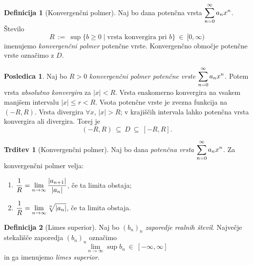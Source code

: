 \documentclass[11pt]{article}
\theoremstyle{definition}
\newtheorem{definicija}{Definicija}[section]
\theoremstyle{definition}
\newtheorem{trditev}{Trditev}[section]
\theoremstyle{definition}
\theoremstyle{theorem}
\newtheorem*{posledica}{Posledica}
\begin{document}
\begin{definicija}[Konvergenčni polmer]

Naj bo dana potenčna vrsta $\mathlarger{\sum_{n=0}^{\infty} a_n x^n}$. Število
$$R ~:=~ \sup \{b \geq 0 \mid \text{vrsta konvergira pri } b \} ~\in~ [0, \infty)$$
imenujemo \textit{konvergenčni polmer} potenčne vrste. Konvergenčno območje potenčne vrste označimo z $D$.

\end{definicija}
\vspace{0.5cm}

\begin{posledica}

Naj bo $R > 0$ \textit{konvergenčni polmer potenčne vrste} $\mathlarger{\sum_{n=0}^{\infty} a_n x^n}$. Potem vrsta \textit{absolutno konvergira} za $|x| < R$. Vrsta enakomerno konvergira na vsakem manjšem intervalu $|x| \leq r < R$. Vsota potenčne vrste je zvezna funkcija na $(-R, R)$. Vrsta divergira $\forall x$, $|x| > R$; v krajiščih intervala lahko potenčna vrsta konvergira ali divergira. Torej je
$$(-R, R) ~\subseteq~ D ~\subseteq~ [-R, R].$$

\end{posledica}
\vspace{0.5cm}

\begin{trditev}[Konvergenčni polmer]

Naj bo dana \textit{potenčna vrsta} $\mathlarger{\sum_{n=0}^\infty a_n x^n}$. Za konvergenčni polmer velja:
\begin{enumerate}
	\item[(1)] $\mathlarger{\frac{1}{R} = \lim_{n \rightarrow \infty} \frac{|a_{n+1}|}{|a_n|}}$, če ta limita obstaja;
	\item[(2)] $\mathlarger{\frac{1}{R} = \lim_{n \rightarrow \infty} \sqrt[n]{|a_n|}}$, če ta limita obstaja.
\end{enumerate}

\end{trditev}
\vspace{0.5cm}

\begin{definicija}[Limes superior]

Naj bo $(b_n)_n$ \textit{zaporedje realnih števil}. Največje stekališče zaporedja $(b_n)_n$ označimo 
$$\lim_{n \rightarrow \infty} \sup b_n ~\in~ [-\infty, \infty]$$
in ga imenujemo \textit{limes superior}.

\end{definicija}
\vspace{0.5cm}
\end{document}
